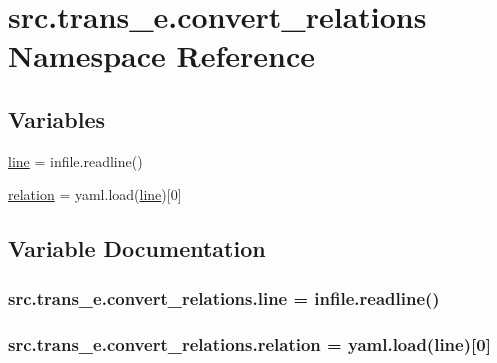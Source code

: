 \hypertarget{namespacesrc_1_1trans__e_1_1convert__relations}{}\section{src.\+trans\+\_\+e.\+convert\+\_\+relations Namespace Reference}
\label{namespacesrc_1_1trans__e_1_1convert__relations}
\subsection*{Variables}
\begin{DoxyCompactItemize}
\item 
\hyperlink{namespacesrc_1_1trans__e_1_1convert__relations_adafb83fe9687e9e69ebb5320a3430c51}{line} = infile.\+readline()
\item 
\hyperlink{namespacesrc_1_1trans__e_1_1convert__relations_a65d1c4e6d9fe59c3d8b11cd5e0399476}{relation} = yaml.\+load(\hyperlink{namespacesrc_1_1trans__e_1_1convert__relations_adafb83fe9687e9e69ebb5320a3430c51}{line})\mbox{[}0\mbox{]}
\end{DoxyCompactItemize}


\subsection{Variable Documentation}
\subsubsection[{\texorpdfstring{line}{line}}]{\setlength{\rightskip}{0pt plus 5cm}src.\+trans\+\_\+e.\+convert\+\_\+relations.\+line = infile.\+readline()}\hypertarget{namespacesrc_1_1trans__e_1_1convert__relations_adafb83fe9687e9e69ebb5320a3430c51}{}\label{namespacesrc_1_1trans__e_1_1convert__relations_adafb83fe9687e9e69ebb5320a3430c51}
\subsubsection[{\texorpdfstring{relation}{relation}}]{\setlength{\rightskip}{0pt plus 5cm}src.\+trans\+\_\+e.\+convert\+\_\+relations.\+relation = yaml.\+load({\bf line})\mbox{[}0\mbox{]}}\hypertarget{namespacesrc_1_1trans__e_1_1convert__relations_a65d1c4e6d9fe59c3d8b11cd5e0399476}{}\label{namespacesrc_1_1trans__e_1_1convert__relations_a65d1c4e6d9fe59c3d8b11cd5e0399476}
